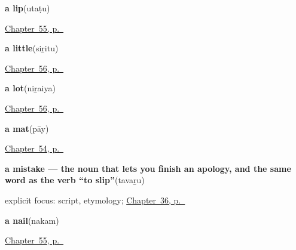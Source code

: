 \noindent\begin{minipage}[t]{\linewidth}
\raggedright
\textbf{a lip}\enspace\emph{}\enspace(utaṭu)\par
\footnotesize \hyperref[ch:ta-the-rest-of-you]{Chapter~55, p.~\pageref*{ch:ta-the-rest-of-you}}
\end{minipage}\par\smallskip

\noindent\begin{minipage}[t]{\linewidth}
\raggedright
\textbf{a little}\enspace\emph{}\enspace(siṟitu)\par
\footnotesize \hyperref[ch:ta-how-much]{Chapter~56, p.~\pageref*{ch:ta-how-much}}
\end{minipage}\par\smallskip

\noindent\begin{minipage}[t]{\linewidth}
\raggedright
\textbf{a lot}\enspace\emph{}\enspace(niṟaiya)\par
\footnotesize \hyperref[ch:ta-how-much]{Chapter~56, p.~\pageref*{ch:ta-how-much}}
\end{minipage}\par\smallskip

\noindent\begin{minipage}[t]{\linewidth}
\raggedright
\textbf{a mat}\enspace\emph{}\enspace(pāy)\par
\footnotesize \hyperref[ch:ta-things-in-the-house]{Chapter~54, p.~\pageref*{ch:ta-things-in-the-house}}
\end{minipage}\par\smallskip

\noindent\begin{minipage}[t]{\linewidth}
\raggedright
\textbf{a mistake — the noun that lets you finish an apology, and the same word as the verb \textquotedblleft{}to slip\textquotedblright{}}\enspace\emph{}\enspace(tavaṟu)\par
\footnotesize explicit focus: script, etymology; \hyperref[ch:ta-what-you-are-offered]{Chapter~36, p.~\pageref*{ch:ta-what-you-are-offered}}
\end{minipage}\par\smallskip

\noindent\begin{minipage}[t]{\linewidth}
\raggedright
\textbf{a nail}\enspace\emph{}\enspace(nakam)\par
\footnotesize \hyperref[ch:ta-the-rest-of-you]{Chapter~55, p.~\pageref*{ch:ta-the-rest-of-you}}
\end{minipage}\par\smallskip

